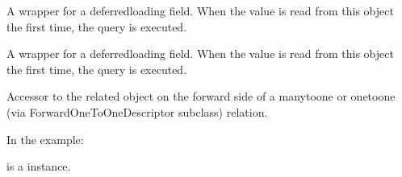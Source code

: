 \documentclass[letterpaper,10pt,spanish]{sphinxmanual}
\begin{document}
\begin{fulllineitems}
\begin{fulllineitems}
\end{fulllineitems}



\begin{fulllineitems}

\pysigstartsignatures
{}
\pysigstopsignatures
\sphinxAtStartPar
A wrapper for a deferred\sphinxhyphen{}loading field. When the value is read from this
object the first time, the query is executed.

\end{fulllineitems}



\begin{fulllineitems}

\pysigstartsignatures
{}
\pysigstopsignatures
\sphinxAtStartPar
A wrapper for a deferred\sphinxhyphen{}loading field. When the value is read from this
object the first time, the query is executed.

\end{fulllineitems}



\begin{fulllineitems}

\pysigstartsignatures
{}
\pysigstopsignatures
\sphinxAtStartPar
Accessor to the related object on the forward side of a many\sphinxhyphen{}to\sphinxhyphen{}one or
one\sphinxhyphen{}to\sphinxhyphen{}one (via ForwardOneToOneDescriptor subclass) relation.

\sphinxAtStartPar
In the example:

\begin{sphinxVerbatim}[commandchars=\\\{\}]
 
       
\end{sphinxVerbatim}

\sphinxAtStartPar
{} is a  instance.

\end{fulllineitems}



\begin{fulllineitems}


\end{fulllineitems}
\end{fulllineitems}
\end{document}
